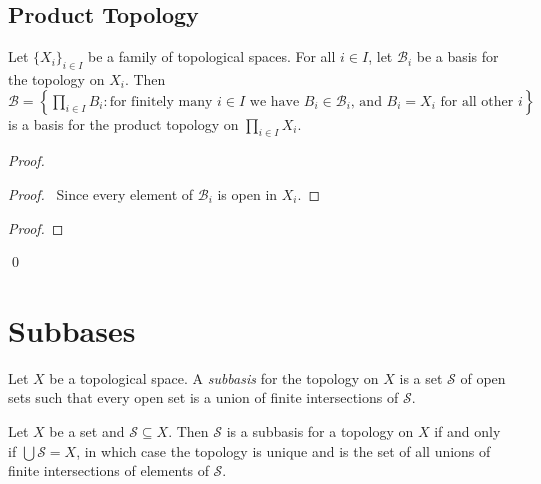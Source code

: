 \subsection{Product Topology}

\begin{prop}
Let $\{X_i\}_{i \in I}$ be a family of topological spaces. For all $i \in I$, let $\mathcal{B}_i$ be a basis for the topology on $X_i$. Then $\mathcal{B} = \left\{ \prod_{i \in I} B_i : \text{for finitely many $i \in I$ we have $B_i \in \mathcal{B}_i$, and $B_i = X_i$ for all other $i$} \right\}$ is a basis for the product topology on $\prod_{i \in I} X_i$.
\end{prop}

\begin{proof}
\pf
{}
\begin{proof}
	\pf\ Since every element of $\mathcal{B}_i$ is open in $X_i$.
\end{proof}
\begin{proof}
\end{proof}
\qed
\end{proof}

\section{Subbases}

\begin{df}[Subbasis]
Let $X$ be a topological space. A \emph{subbasis} for the topology on $X$ is a set $\mathcal{S}$ of open sets such that every open set is a union of finite intersections of $\mathcal{S}$.
\end{df}

\begin{prop}
Let $X$ be a set and $\mathcal{S} \subseteq X$. Then $\mathcal{S}$ is a subbasis for a topology on $X$ if and only if $\bigcup \mathcal{S} = X$, in which case the topology is unique and is the set of all unions of finite intersections of elements of $\mathcal{S}$.
\end{prop}

